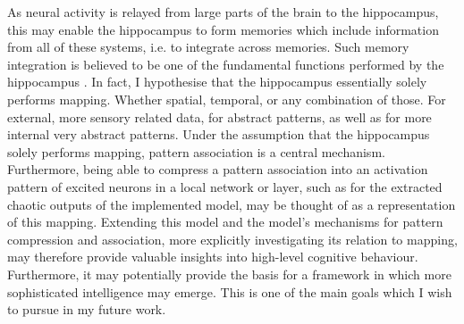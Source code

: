 As neural activity is relayed from large parts of the brain to the hippocampus, this may enable the hippocampus to form memories which include information from all of these systems, i.e. to integrate across memories. Such memory integration is believed to be one of the fundamental functions performed by the hippocampus \citep{Rolls1998chpt1}.
In fact, I hypothesise that the hippocampus essentially solely performs mapping. Whether spatial, temporal, or any combination of those. For external, more sensory related data, for abstract patterns, as well as for more internal very abstract patterns. 
Under the assumption that the hippocampus solely performs mapping, pattern association is a central mechanism. Furthermore, being able to compress a pattern association into an activation pattern of excited neurons in a local network or layer, such as for the extracted chaotic outputs of the implemented model, may be thought of as a representation of this mapping. 
Extending this model and the model's mechanisms for pattern compression and association, more explicitly investigating its relation to mapping, may therefore provide valuable insights into high-level cognitive behaviour. Furthermore, it may potentially provide the basis for a framework in which more sophisticated intelligence may emerge. This is one of the main goals which I wish to pursue in my future work.






\cleardoublepage